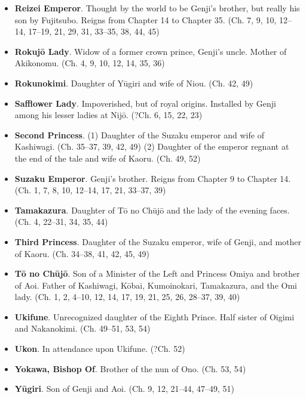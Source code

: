 \documentclass{article}
\begin{document}
\begin{multicols}{2}
\begin{itemize}[
			label=,
			leftmargin=0em,
			rightmargin=-1.5em,
			itemindent=-2em,
			nosep,
		]
		\item \textbf{Reizei Emperor}. Thought by the world to be Genji's brother, but really his son by Fujitsubo. Reigns from Chapter 14 to Chapter 35. (Ch. 7, 9, 10, 12--14, 17--19, 21, 29, 31, 33--35, 38, 44, 45)

		\item \textbf{Rokujō Lady}. Widow of a former crown prince, Genji's uncle. Mother of Akikonomu. (Ch. 4, 9, 10, 12, 14, 35, 36)

		\item \textbf{Rokunokimi}. Daughter of Yūgiri and wife of Niou. (Ch. 42, 49)

		\item \textbf{Safflower Lady}. Impoverished, but of royal origins. Installed by Genji among his lesser ladies at Nijō. (?Ch. 6, 15, 22, 23)

		\item \textbf{Second Princess}. 
		(1) Daughter of the Suzaku emperor and wife of Kashiwagi. (Ch. 35--37, 39, 42, 49)
		(2) Daughter of the emperor regnant at the end of the tale and wife of Kaoru. (Ch. 49, 52)

		\item \textbf{Suzaku Emperor}. Genji's brother. Reigns from Chapter 9 to Chapter 14. (Ch. 1, 7, 8, 10, 12--14, 17, 21, 33--37, 39)

		\item \textbf{Tamakazura}. Daughter of Tō no Chūjō and the lady of the evening faces. (Ch. 4, 22--31, 34, 35, 44)

		\item \textbf{Third Princess}. Daughter of the Suzaku emperor, wife of Genji, and mother of Kaoru. (Ch. 34--38, 41, 42, 45, 49)

		\item \textbf{Tō no Chūjō}. Son of a Minister of the Left and Princess Omiya and brother of Aoi. Father of Kashiwagi, Kōbai, Kumoinokari, Tamakazura, and the Omi lady. (Ch. 1, 2, 4--10, 12, 14, 17, 19, 21, 25, 26, 28--37, 39, 40)

		\item \textbf{Ukifune}. Unrecognized daughter of the Eighth Prince. Half sister of Oigimi and Nakanokimi. (Ch. 49--51, 53, 54)

		\item \textbf{Ukon}. In attendance upon Ukifune. (?Ch. 52)

		\item \textbf{Yokawa, Bishop Of}. Brother of the nun of Ono. (Ch. 53, 54)

		\item \textbf{Yūgiri}. Son of Genji and Aoi. (Ch. 9, 12, 21--44, 47--49, 51)

	\end{itemize}



\end{multicols}
\end{document}

